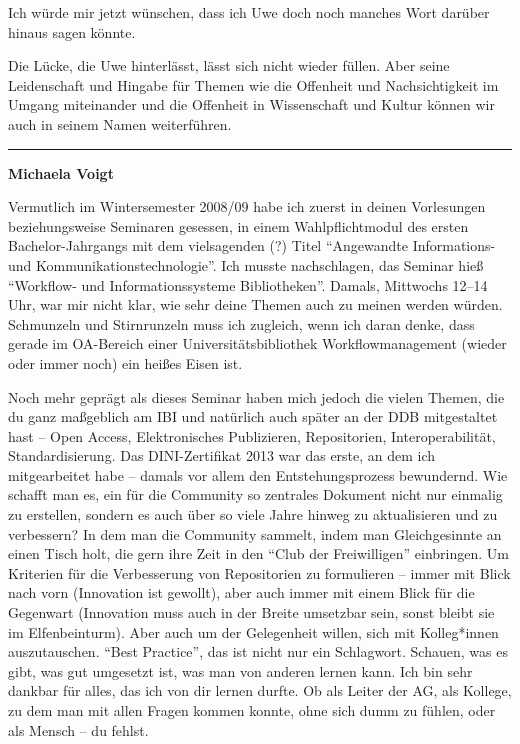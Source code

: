 \documentclass[a4paper,
fontsize=11pt,
oneside,
numbers=noperiodatend,
parskip=half-,
bibliography=totoc,
final
]{scrartcl}
\begin{document}
Ich würde mir jetzt wünschen, dass ich Uwe doch noch manches Wort
darüber hinaus sagen könnte.

Die Lücke, die Uwe hinterlässt, lässt sich nicht wieder füllen. Aber
seine Leidenschaft und Hingabe für Themen wie die Offenheit und
Nachsichtigkeit im Umgang miteinander und die Offenheit in Wissenschaft
und Kultur können wir auch in seinem Namen weiterführen.

\begin{center}\rule{0.5\linewidth}{0.5pt}\end{center}

\textbf{Michaela Voigt}

Vermutlich im Wintersemester 2008/09 habe ich zuerst in deinen
Vorlesungen beziehungsweise Seminaren gesessen, in einem
Wahlpflichtmodul des ersten Bachelor-Jahrgangs mit dem vielsagenden (?)
Titel \enquote{Angewandte Informations- und Kommunikationstechnologie}.
Ich musste nachschlagen, das Seminar hieß \enquote{Workflow- und
Informationssysteme Bibliotheken}. Damals, Mittwochs 12--14 Uhr, war mir
nicht klar, wie sehr deine Themen auch zu meinen werden würden.
Schmunzeln und Stirnrunzeln muss ich zugleich, wenn ich daran denke,
dass gerade im OA-Bereich einer Universitätsbibliothek
Workflowmanagement (wieder oder immer noch) ein heißes Eisen ist.

Noch mehr geprägt als dieses Seminar haben mich jedoch die vielen
Themen, die du ganz maßgeblich am IBI und natürlich auch später an der
DDB mitgestaltet hast -- Open Access, Elektronisches Publizieren,
Repositorien, Interoperabilität, Standardisierung. Das DINI-Zertifikat
2013 war das erste, an dem ich mitgearbeitet habe -- damals vor allem
den Entstehungsprozess bewundernd. Wie schafft man es, ein für die
Community so zentrales Dokument nicht nur einmalig zu erstellen, sondern
es auch über so viele Jahre hinweg zu aktualisieren und zu verbessern?
In dem man die Community sammelt, indem man Gleichgesinnte an einen
Tisch holt, die gern ihre Zeit in den \enquote{Club der Freiwilligen}
einbringen. Um Kriterien für die Verbesserung von Repositorien zu
formulieren -- immer mit Blick nach vorn (Innovation ist gewollt), aber
auch immer mit einem Blick für die Gegenwart (Innovation muss auch in
der Breite umsetzbar sein, sonst bleibt sie im Elfenbeinturm). Aber auch
um der Gelegenheit willen, sich mit Kolleg*innen auszutauschen.
\enquote{Best Practice}, das ist nicht nur ein Schlagwort. Schauen, was
es gibt, was gut umgesetzt ist, was man von anderen lernen kann. Ich bin
sehr dankbar für alles, das ich von dir lernen durfte. Ob als Leiter der
AG, als Kollege, zu dem man mit allen Fragen kommen konnte, ohne sich
dumm zu fühlen, oder als Mensch -- du fehlst.
\end{document}
